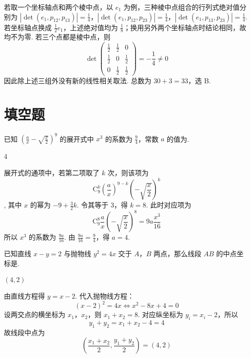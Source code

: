 \documentclass[UTF8,a4paper,oneside,11pt]{ctexbook}
\begin{document}
\begin{solution}
若取一个坐标轴点和两个棱中点，以 \(e_1\) 为例，三种棱中点组合的行列式绝对值分别为 \(\left|\det(e_1,p_{12},p_{13})\right|=\frac14\)，\(\left|\det(e_1,p_{12},p_{23})\right|=\frac14\)，\(\left|\det(e_1,p_{13},p_{23})\right|=\frac14\).
若坐标轴点换成 \(\frac12e_1\)，上述绝对值均为 \(\frac18\)；换用另外两个坐标轴点时结论相同，故均不为零. 若三个点都是棱中点，则
\[
\det\begin{pmatrix}\frac12&\frac12&0\\\frac12&0&\frac12\\0&\frac12&\frac12\end{pmatrix}=-\frac14\ne0
\]
因此除上述三组外没有新的线性相关取法. 总数为 \(30+3=33\)，选 B.
\end{solution}

\section{填空题}

\begin{problem}
已知 \(\left(\frac{a}{x} - \sqrt{\frac{x}{2}}\right)^9\) 的展开式中 \(x^3\) 的系数为 \(\frac{9}{4}\)，常数 \(a\) 的值为\fillinblank{}.
\end{problem}

\begin{answer}
4
\end{answer}

\begin{solution}
展开式的通项中，若第二项取了 \(k\) 次，则该项为
\[
\mathrm C_9^k\left(\frac ax\right)^{9-k}
\left(-\sqrt{\frac x2}\right)^k
\],
其中 \(x\) 的幂为 \(-9+\frac32k\). 令其等于 \(3\)，得 \(k=8\). 此时对应项为
\[
\mathrm C_9^8\frac ax\left(-\sqrt{\frac x2}\right)^8
=9a\frac{x^3}{16}
\]
所以 \(x^3\) 的系数为 \(\frac{9a}{16}\). 由 \(\frac{9a}{16}=\frac94\)，得 \(a=4\).
\end{solution}

\begin{problem}
已知直线 \(x - y = 2\) 与抛物线 \(y^{2} = 4x\) 交于 \(A\)，\(B\) 两点，那么线段 \(AB\) 的中点坐标是\fillinblank{}.
\end{problem}

\begin{answer}
\((4,2)\)
\end{answer}

\begin{solution}
由直线方程得 \(y=x-2\). 代入抛物线方程：
\[
(x-2)^2=4x
\iff x^2-8x+4=0
\]
设两交点的横坐标为 \(x_1\)，\(x_2\)，则 \(x_1+x_2=8\). 对应纵坐标为 \(y_i=x_i-2\)，所以
\[
y_1+y_2=x_1+x_2-4=4
\]
故线段中点为
\[
\left(\frac{x_1+x_2}{2},\frac{y_1+y_2}{2}\right)=(4,2)
\]
\end{solution}
\end{document}

